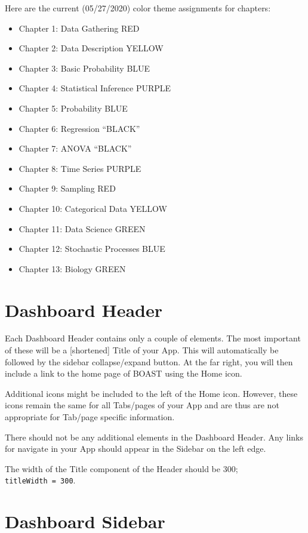 \documentclass[
]{book}
\providecommand{\tightlist}{%
  \setlength{\itemsep}{0pt}\setlength{\parskip}{0pt}}
\begin{document}
Here are the current (05/27/2020) color theme assignments for chapters:

\begin{itemize}
\tightlist
\item
  Chapter 1: Data Gathering RED
\item
  Chapter 2: Data Description YELLOW
\item
  Chapter 3: Basic Probability BLUE
\item
  Chapter 4: Statistical Inference PURPLE
\item
  Chapter 5: Probability BLUE
\item
  Chapter 6: Regression ``BLACK''
\item
  Chapter 7: ANOVA ``BLACK''
\item
  Chapter 8: Time Series PURPLE
\item
  Chapter 9: Sampling RED
\item
  Chapter 10: Categorical Data YELLOW
\item
  Chapter 11: Data Science GREEN
\item
  Chapter 12: Stochastic Processes BLUE
\item
  Chapter 13: Biology GREEN
\end{itemize}

\hypertarget{dashboard-header}{%
\section{Dashboard Header}\label{dashboard-header}}

Each Dashboard Header contains only a couple of elements. The most important of these will be a {[}shortened{]} Title of your App. This will automatically be followed by the sidebar collapse/expand button. At the far right, you will then include a link to the home page of BOAST using the Home icon.

Additional icons might be included to the left of the Home icon. However, these icons remain the same for all Tabs/pages of your App and are thus are not appropriate for Tab/page specific information.

There should not be any additional elements in the Dashboard Header. Any links for navigate in your App should appear in the Sidebar on the left edge.

The width of the Title component of the Header should be 300; \texttt{titleWidth\ =\ 300}.

\hypertarget{dashboard-sidebar}{%
\section{Dashboard Sidebar}\label{dashboard-sidebar}}
\end{document}
